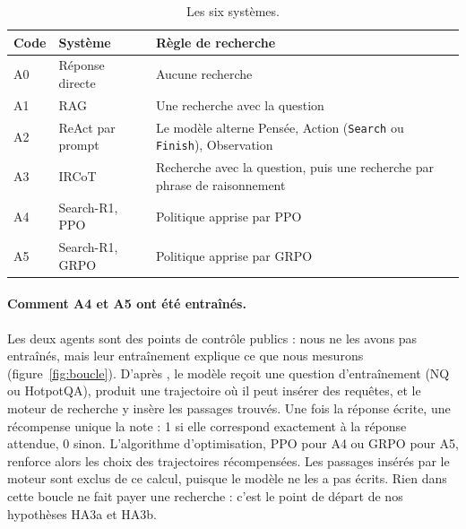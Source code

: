 \documentclass[11pt,a4paper]{article}
\begin{document}
\begin{table}[ht]
\centering\small
\begin{tabular}{@{}llp{8cm}@{}}
\toprule
Code & Système & Règle de recherche\\
\midrule
A0 & Réponse directe & Aucune recherche\\
A1 & RAG & Une recherche avec la question\\
A2 & ReAct par prompt & Le modèle alterne Pensée, Action (\texttt{Search} ou \texttt{Finish}), Observation\\
A3 & IRCoT & Recherche avec la question, puis une recherche par phrase de raisonnement\\
A4 & Search-R1, PPO & Politique apprise par PPO\\
A5 & Search-R1, GRPO & Politique apprise par GRPO\\
\bottomrule
\end{tabular}
\caption{Les six systèmes.}
\label{tab:sys}
\end{table}

\paragraph{Comment A4 et A5 ont été entraînés.} Les deux agents sont des points de contrôle publics : nous ne les avons pas entraînés, mais leur entraînement explique ce que nous mesurons (figure~\ref{fig:boucle}). D'après \citet{jin2025search}, le modèle reçoit une question d'entraînement (NQ ou HotpotQA), produit une trajectoire où il peut insérer des requêtes, et le moteur de recherche y insère les passages trouvés. Une fois la réponse écrite, une récompense unique la note : 1 si elle correspond exactement à la réponse attendue, 0 sinon. L'algorithme d'optimisation, PPO \citep{schulman2017proximal} pour A4 ou GRPO \citep{shao2024deepseekmath} pour A5, renforce alors les choix des trajectoires récompensées. Les passages insérés par le moteur sont exclus de ce calcul, puisque le modèle ne les a pas écrits. Rien dans cette boucle ne fait payer une recherche : c'est le point de départ de nos hypothèses HA3a et HA3b.
\end{document}
